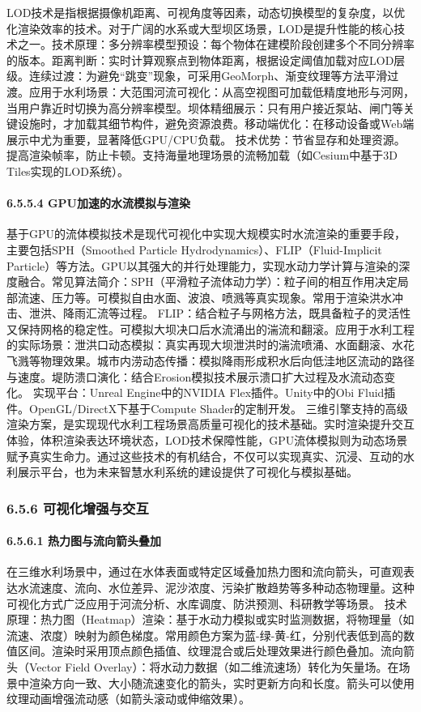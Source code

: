 LOD技术是指根据摄像机距离、可视角度等因素，动态切换模型的复杂度，以优化渲染效率的技术。对于广阔的水系或大型坝区场景，LOD是提升性能的核心技术之一。技术原理：多分辨率模型预设：每个物体在建模阶段创建多个不同分辨率的版本。距离判断：实时计算观察点到物体距离，根据设定阈值加载对应LOD层级。连续过渡：为避免``跳变''现象，可采用GeoMorph、渐变纹理等方法平滑过渡。应用于水利场景：大范围河流可视化：从高空视图可加载低精度地形与河网，当用户靠近时切换为高分辨率模型。坝体精细展示：只有用户接近泵站、闸门等关键设施时，才加载其细节构件，避免资源浪费。移动端优化：在移动设备或Web端展示中尤为重要，显著降低GPU/CPU负载。 技术优势：节省显存和处理资源。提高渲染帧率，防止卡顿。支持海量地理场景的流畅加载（如Cesium中基于3D Tiles实现的LOD系统）。 \paragraph{6.5.5.4 GPU加速的水流模拟与渲染}\label{gpuux52a0ux901fux7684ux6c34ux6d41ux6a21ux62dfux4e0eux6e32ux67d3} 基于GPU的流体模拟技术是现代可视化中实现大规模实时水流渲染的重要手段，主要包括SPH（Smoothed Particle Hydrodynamics）、FLIP（Fluid-Implicit Particle）等方法。GPU以其强大的并行处理能力，实现水动力学计算与渲染的深度融合。常见算法简介：SPH（平滑粒子流体动力学）：粒子间的相互作用决定局部流速、压力等。可模拟自由水面、波浪、喷溅等真实现象。常用于渲染洪水冲击、泄洪、降雨汇流等过程。 FLIP：结合粒子与网格方法，既具备粒子的灵活性又保持网格的稳定性。可模拟大坝决口后水流涌出的湍流和翻滚。应用于水利工程的实际场景：泄洪口动态模拟：真实再现大坝泄洪时的湍流喷涌、水面翻滚、水花飞溅等物理效果。城市内涝动态传播：模拟降雨形成积水后向低洼地区流动的路径与速度。堤防溃口演化：结合Erosion模拟技术展示溃口扩大过程及水流动态变化。 实现平台：Unreal Engine中的NVIDIA Flex插件。Unity中的Obi Fluid插件。OpenGL/DirectX下基于Compute Shader的定制开发。 三维引擎支持的高级渲染方案，是实现现代水利工程场景高质量可视化的技术基础。实时渲染提升交互体验，体积渲染表达环境状态，LOD技术保障性能，GPU流体模拟则为动态场景赋予真实生命力。通过这些技术的有机结合，不仅可以实现真实、沉浸、互动的水利展示平台，也为未来智慧水利系统的建设提供了可视化与模拟基础。 \subsubsection{6.5.6 可视化增强与交互}\label{ux53efux89c6ux5316ux589eux5f3aux4e0eux4ea4ux4e92} \paragraph{6.5.6.1 热力图与流向箭头叠加}\label{ux70edux529bux56feux4e0eux6d41ux5411ux7badux5934ux53e0ux52a0} 在三维水利场景中，通过在水体表面或特定区域叠加热力图和流向箭头，可直观表达水流速度、流向、水位差异、泥沙浓度、污染扩散趋势等多种动态物理量。这种可视化方式广泛应用于河流分析、水库调度、防洪预测、科研教学等场景。 技术原理：热力图（Heatmap）渲染：基于水动力模拟或实时监测数据，将物理量（如流速、浓度）映射为颜色梯度。常用颜色方案为蓝-绿-黄-红，分别代表低到高的数值区间。渲染时采用顶点颜色插值、纹理混合或后处理效果进行颜色叠加。流向箭头（Vector Field Overlay）：将水动力数据（如二维流速场）转化为矢量场。在场景中渲染方向一致、大小随流速变化的箭头，实时更新方向和长度。箭头可以使用纹理动画增强流动感（如箭头滚动或伸缩效果）。 
